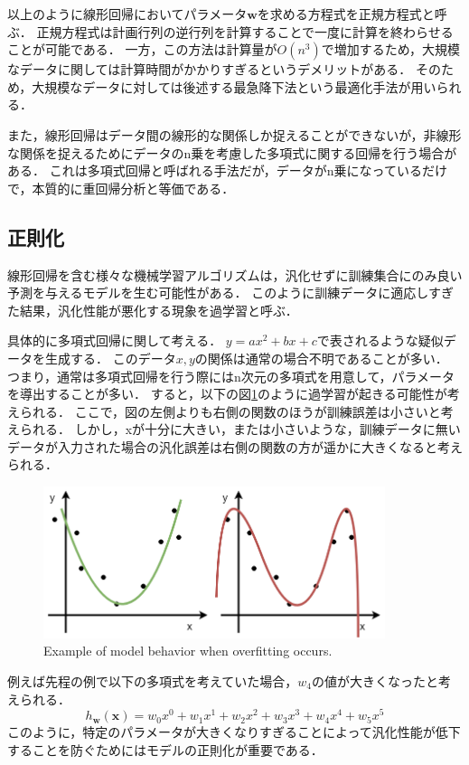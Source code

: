     以上のように線形回帰においてパラメータ$\bm{w}$を求める方程式を正規方程式と呼ぶ．
    正規方程式は計画行列の逆行列を計算することで一度に計算を終わらせることが可能である．
    一方，この方法は計算量が$O(n^3)$で増加するため，大規模なデータに関しては計算時間がかかりすぎるというデメリットがある．
    そのため，大規模なデータに対しては後述する最急降下法という最適化手法が用いられる．
    
    また，線形回帰はデータ間の線形的な関係しか捉えることができないが，非線形な関係を捉えるためにデータのn乗を考慮した多項式に関する回帰を行う場合がある．
    これは多項式回帰と呼ばれる手法だが，データがn乗になっているだけで，本質的に重回帰分析と等価である．

\subsection{正則化}
    線形回帰を含む様々な機械学習アルゴリズムは，汎化せずに訓練集合にのみ良い予測を与えるモデルを生む可能性がある．
    このように訓練データに適応しすぎた結果，汎化性能が悪化する現象を過学習と呼ぶ．
    
    具体的に多項式回帰に関して考える．
    $y=ax^2+bx+c$で表されるような疑似データを生成する．
    このデータ${x,y}$の関係は通常の場合不明であることが多い．
    つまり，通常は多項式回帰を行う際にはn次元の多項式を用意して，パラメータを導出することが多い．
    すると，以下の図\ref{2_overfitting}のように過学習が起きる可能性が考えられる．
    ここで，図の左側よりも右側の関数のほうが訓練誤差は小さいと考えられる．
    しかし，xが十分に大きい，または小さいような，訓練データに無いデータが入力された場合の汎化誤差は右側の関数の方が遥かに大きくなると考えられる．

    \begin{figure}[t]
        \begin{center}
            \includegraphics[width=10.0cm]{./8_appendix/img/regularization}
            \caption{Example of model behavior when overfitting occurs.}
            \label{2_overfitting}
        \end{center}
    \end{figure}
    例えば先程の例で以下の多項式を考えていた場合，$w_4$の値が大きくなったと考えられる．
    \begin{equation}
        h_{\bm{w}}(\bm{x}) = w_0 x^0 + w_1 x^1 + w_2 x^2 + w_3 x^3 + w_4 x^4 + w_5 x^5
    \end{equation}
    このように，特定のパラメータが大きくなりすぎることによって汎化性能が低下することを防ぐためにはモデルの正則化が重要である．
    
